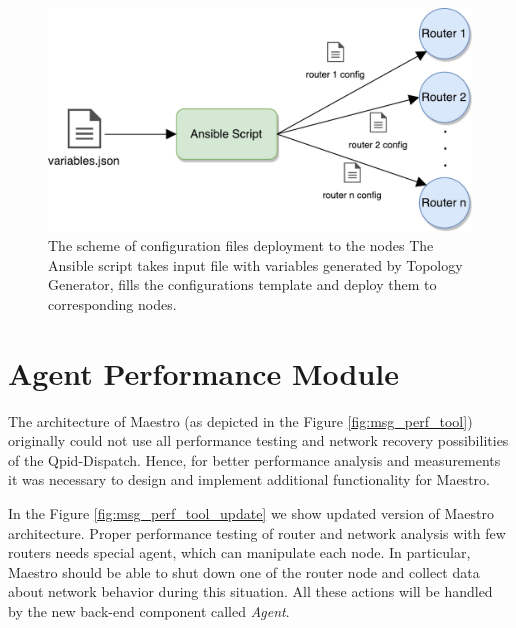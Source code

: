 \begin{figure}[H]
  \centering
  \includegraphics[width=12cm]{obrazky-figures/deployment.pdf}
  \caption{The scheme of configuration files deployment to the nodes The Ansible script takes input file with variables generated by Topology Generator, fills the configurations template and deploy them to corresponding nodes.}
  \label{fig:deployment}
\end{figure}


\section{Agent Performance Module}
The architecture of Maestro (as depicted in the Figure \ref{fig:msg_perf_tool}) originally could not use all performance testing and network recovery possibilities of the Qpid-Dispatch. Hence, for better performance analysis and measurements it was necessary to design and implement additional functionality for Maestro.

In the Figure \ref{fig:msg_perf_tool_update} we show updated version of Maestro architecture. Proper performance testing of router and network analysis with few routers needs special agent, which can manipulate each node. In particular, Maestro should be able to shut down one of the router node and collect data about network behavior during this situation. All these actions will be handled by the new back-end component called \emph{Agent}.

